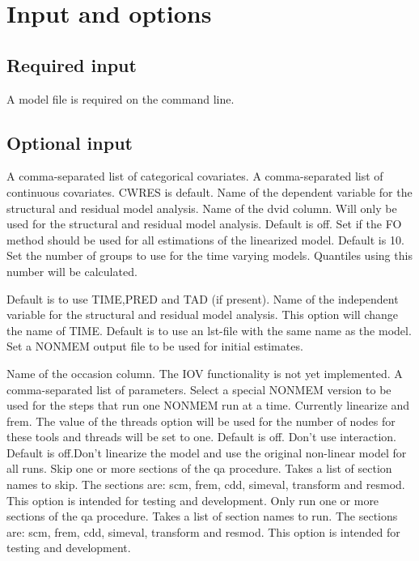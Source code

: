 \section{Input and options}

\subsection{Required input}
A model file is required on the command line.

\subsection{Optional input}

\begin{optionlist}
A comma-separated list of categorical covariates.
\nextopt
{}
A comma-separated list of continuous covariates.
\nextopt
{}
CWRES is default. Name of the dependent variable for the structural and residual model analysis. 
\nextopt
{}
Name of the dvid column.
Will only be used for the structural and residual model analysis.
\nextopt
{}
Default is off. Set if the FO method should be used for all estimations
of the linearized model. 
\nextopt
{}
Default is 10. Set the number of groups to use for the time varying models.
Quantiles using this number will be calculated.

\nextopt
{}
Default is to use TIME,PRED and TAD (if present). Name of the independent variable for the structural and residual model analysis.
This option will change the name of TIME.
\nextopt
{}
Default is to use an lst-file with the same name as the model. Set a NONMEM output file to be used for initial estimates.

\nextopt
{}
Name of the occasion column. The IOV functionality is not yet implemented.
\nextopt
{}
A comma-separated list of parameters.
\nextopt
{}
	Select a special NONMEM version to be used for the steps
    that run one NONMEM run at a time. Currently linearize
    and frem. The value of the threads option will be used for
    the number of nodes for these tools and threads will be set
    to one.
\nextopt
{}
Default is off. Don't use interaction. 
\nextopt
{}
Default is off.Don't linearize the model and use the original non-linear model for all runs. 
\nextopt
{}
Skip one or more sections of the qa procedure. Takes a list of section names to skip. The sections are: scm, frem, cdd, simeval,
transform and resmod. This option is intended for testing and development.
\nextopt
{}
Only run one or more sections of the qa procedure. Takes a list of section names to run. The sections are: scm, frem, cdd, simeval, transform and resmod. This option is intended for testing and development.
    \nextopt
\end{optionlist}

